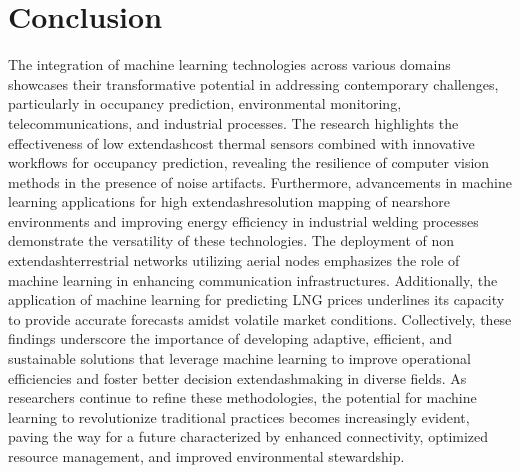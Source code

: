 \documentclass[runningheads]{llncs}
\begin{document}
\section{Conclusion}
The integration of machine learning technologies across various domains showcases their transformative potential in addressing contemporary challenges, particularly in occupancy prediction, environmental monitoring, telecommunications, and industrial processes. The research highlights the effectiveness of low	extendash{}cost thermal sensors combined with innovative workflows for occupancy prediction, revealing the resilience of computer vision methods in the presence of noise artifacts. Furthermore, advancements in machine learning applications for high	extendash{}resolution mapping of nearshore environments and improving energy efficiency in industrial welding processes demonstrate the versatility of these technologies. The deployment of non	extendash{}terrestrial networks utilizing aerial nodes emphasizes the role of machine learning in enhancing communication infrastructures. Additionally, the application of machine learning for predicting LNG prices underlines its capacity to provide accurate forecasts amidst volatile market conditions. Collectively, these findings underscore the importance of developing adaptive, efficient, and sustainable solutions that leverage machine learning to improve operational efficiencies and foster better decision	extendash{}making in diverse fields. As researchers continue to refine these methodologies, the potential for machine learning to revolutionize traditional practices becomes increasingly evident, paving the way for a future characterized by enhanced connectivity, optimized resource management, and improved environmental stewardship.
\end{document}
